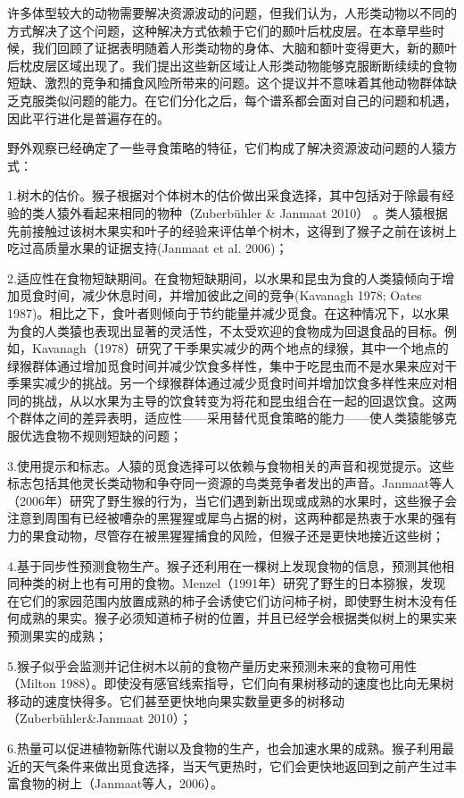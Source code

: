 许多体型较大的动物需要解决资源波动的问题，但我们认为，人形类动物以不同的方式解决了这个问题，这种解决方式依赖于它们的颞叶后枕皮层。在本章早些时候，我们回顾了证据表明随着人形类动物的身体、大脑和额叶变得更大，新的颞叶后枕皮层区域出现了。我们提出这些新区域让人形类动物能够克服断断续续的食物短缺、激烈的竞争和捕食风险所带来的问题。这个提议并不意味着其他动物群体缺乏克服类似问题的能力。在它们分化之后，每个谱系都会面对自己的问题和机遇，因此平行进化是普遍存在的。

野外观察已经确定了一些寻食策略的特征，它们构成了解决资源波动问题的人猿方式：\par
1.树木的估价。猴子根据对个体树木的估价做出采食选择，其中包括对于除最有经验的类人猿外看起来相同的物种（Zuberbühler \& Janmaat 2010） 。类人猿根据先前接触过该树木果实和叶子的经验来评估单个树木，这得到了猴子之前在该树上吃过高质量水果的证据支持(Janmaat et al. 2006)；\par
2.适应性在食物短缺期间。在食物短缺期间，以水果和昆虫为食的人类猿倾向于增加觅食时间，减少休息时间，并增加彼此之间的竞争(Kavanagh 1978; Oates 1987)。相比之下，食叶者则倾向于节约能量并减少觅食。在这种情况下，以水果为食的人类猿也表现出显著的灵活性，不太受欢迎的食物成为回退食品的目标。例如，Kavanagh（1978）研究了干季果实减少的两个地点的绿猴，其中一个地点的绿猴群体通过增加觅食时间并减少饮食多样性，集中于吃昆虫而不是水果来应对干季果实减少的挑战。另一个绿猴群体通过减少觅食时间并增加饮食多样性来应对相同的挑战，从以水果为主导的饮食转变为将花和昆虫组合在一起的回退饮食。这两个群体之间的差异表明，适应性——采用替代觅食策略的能力——使人类猿能够克服优选食物不规则短缺的问题；\par
3.使用提示和标志。人猿的觅食选择可以依赖与食物相关的声音和视觉提示。这些标志包括其他灵长类动物和争夺同一资源的鸟类竞争者发出的声音。Janmaat等人（2006年）研究了野生猴的行为，当它们遇到新出现或成熟的水果时，这些猴子会注意到周围有已经被嘈杂的黑猩猩或犀鸟占据的树，这两种都是热衷于水果的强有力的果食动物，尽管存在被黑猩猩捕食的风险，但猴子还是更快地接近这些树；\par
4.基于同步性预测食物生产。猴子还利用在一棵树上发现食物的信息，预测其他相同种类的树上也有可用的食物。Menzel（1991年）研究了野生的日本猕猴，发现在它们的家园范围内放置成熟的柿子会诱使它们访问柿子树，即使野生树木没有任何成熟的果实。猴子必须知道柿子树的位置，并且已经学会根据类似树上的果实来预测果实的成熟；\par
5.猴子似乎会监测并记住树木以前的食物产量历史来预测未来的食物可用性（Milton 1988）。即使没有感官线索指导，它们向有果树移动的速度也比向无果树移动的速度快得多。它们甚至更快地向果实数量更多的树移动（Zuberbühler\&Janmaat 2010）；\par
6.热量可以促进植物新陈代谢以及食物的生产，也会加速水果的成熟。猴子利用最近的天气条件来做出觅食选择，当天气更热时，它们会更快地返回到之前产生过丰富食物的树上（Janmaat等人，2006）。

